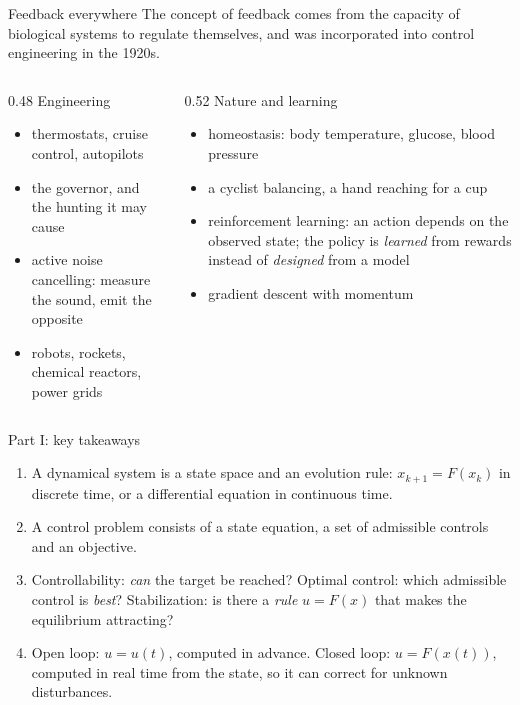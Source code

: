 \documentclass[10pt]{beamer}
\begin{document}
\begin{frame}{Feedback everywhere}
\footnotesize
The concept of feedback comes from the capacity of biological systems to regulate themselves, and was incorporated into control engineering in the 1920s.

\medskip
\begin{columns}[T]
\begin{column}{0.48\textwidth}
\alert{Engineering}
\begin{itemize}
\item thermostats, cruise control, autopilots
\item the governor, and the hunting it may cause
\item active noise cancelling: measure the sound, emit the opposite
\item robots, rockets, chemical reactors, power grids
\end{itemize}
\end{column}
\begin{column}{0.52\textwidth}
\alert{Nature and learning}
\begin{itemize}
\item homeostasis: body temperature, glucose, blood pressure
\item a cyclist balancing, a hand reaching for a cup
\item reinforcement learning: an action depends on the observed state; the policy is \emph{learned} from rewards instead of \emph{designed} from a model
\item gradient descent with momentum
\end{itemize}
\end{column}
\end{columns}


\end{frame}


\begin{frame}{Part I: key takeaways}
\begin{enumerate}
\item A dynamical system is a state space and an evolution rule: $x_{k+1}=F(x_k)$ in discrete time, or a differential equation in continuous time.
\item A control problem consists of a state equation, a set of admissible controls and an objective.

\item Controllability: \emph{can} the target be reached? Optimal control: which admissible control is \emph{best}? Stabilization: is there a \emph{rule} $u=F(x)$ that makes the equilibrium attracting?
\item Open loop: $u=u(t)$, computed in advance. Closed loop: $u=F(x(t))$, computed in real time from the state, so it can correct for unknown disturbances.
\end{enumerate}
\end{frame}
\end{document}
